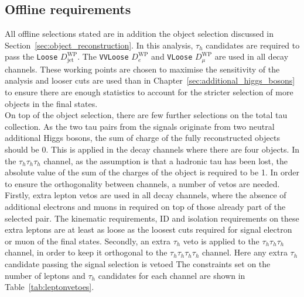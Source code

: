 \subsection{Offline requirements}

All offline selections stated are in addition the object selection discussed in Section~\ref{sec:object_reconstruction}.
In this analysis, $\tau_h$ candidates are required to pass the \texttt{Loose} $D_{\text{jet}}^{\text{WP}}$.
The \texttt{VVLoose} $D_{e}^{\text{WP}}$ and \texttt{VLoose} $D_{\mu}^{\text{WP}}$ are used in all decay channels.
These working points are chosen to maximise the sensitivity of the analysis and looser cuts are used than in Chapter~\ref{sec:additional_higgs_bosons} to ensure there are enough statistics to account for the stricter selection of more objects in the final states. \\

On top of the object selection, there are few further selections on the total tau collection.
As the two tau pairs from the signals originate from two neutral additional Higgs bosons, the sum of charge of the fully reconstructed objects should be 0. 
This is applied in the decay channels where there are four objects. 
In the $\tau_h \tau_h \tau_h$ channel, as the assumption is that a hadronic tau has been lost, the absolute value of the sum of the charges of the object is required to be 1.
In order to ensure the orthogonality between channels, a number of vetos are needed. 
Firstly, extra lepton vetos are used in all decay channels, where the absence of additional electrons and muons in required on top of those already part of the selected pair.
The kinematic requirements, ID and isolation requirements on these extra leptons are at least as loose as the loosest cuts required for signal electron or muon of the final states.
Secondly, an extra $\tau_h$ veto is applied to the $\tau_h \tau_h \tau_h$ channel, in order to keep it orthogonal to the $\tau_h \tau_h \tau_h \tau_h$ channel.
Here any extra $\tau_h$ candidate passing the signal selection is vetoed
The constraints set on the number of leptons and $\tau_h$ candidates for each channel are shown in Table~\ref{tab:leptonvetoes}. \\


